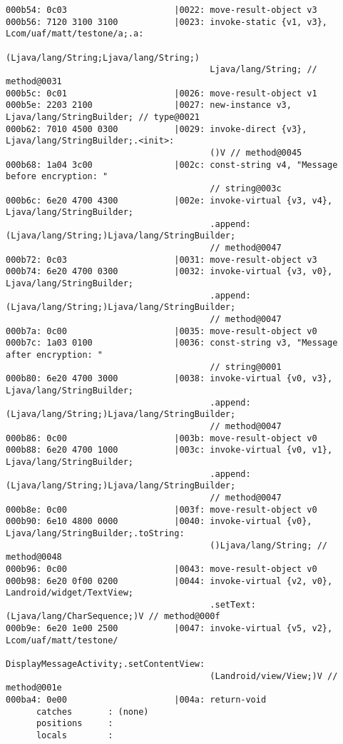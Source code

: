 \begin{lstlisting}
000b54: 0c03                     |0022: move-result-object v3
000b56: 7120 3100 3100           |0023: invoke-static {v1, v3}, Lcom/uaf/matt/testone/a;.a:
                                        (Ljava/lang/String;Ljava/lang/String;)
                                        Ljava/lang/String; // method@0031
000b5c: 0c01                     |0026: move-result-object v1
000b5e: 2203 2100                |0027: new-instance v3, Ljava/lang/StringBuilder; // type@0021
000b62: 7010 4500 0300           |0029: invoke-direct {v3}, Ljava/lang/StringBuilder;.<init>:
                                        ()V // method@0045
000b68: 1a04 3c00                |002c: const-string v4, "Message before encryption: "
                                        // string@003c
000b6c: 6e20 4700 4300           |002e: invoke-virtual {v3, v4}, Ljava/lang/StringBuilder;
                                        .append:(Ljava/lang/String;)Ljava/lang/StringBuilder;
                                        // method@0047
000b72: 0c03                     |0031: move-result-object v3
000b74: 6e20 4700 0300           |0032: invoke-virtual {v3, v0}, Ljava/lang/StringBuilder;
                                        .append:(Ljava/lang/String;)Ljava/lang/StringBuilder;
                                        // method@0047
000b7a: 0c00                     |0035: move-result-object v0
000b7c: 1a03 0100                |0036: const-string v3, "Message after encryption: "
                                        // string@0001
000b80: 6e20 4700 3000           |0038: invoke-virtual {v0, v3}, Ljava/lang/StringBuilder;
                                        .append:(Ljava/lang/String;)Ljava/lang/StringBuilder;
                                        // method@0047
000b86: 0c00                     |003b: move-result-object v0
000b88: 6e20 4700 1000           |003c: invoke-virtual {v0, v1}, Ljava/lang/StringBuilder;
                                        .append:(Ljava/lang/String;)Ljava/lang/StringBuilder;
                                        // method@0047
000b8e: 0c00                     |003f: move-result-object v0
000b90: 6e10 4800 0000           |0040: invoke-virtual {v0}, Ljava/lang/StringBuilder;.toString:
                                        ()Ljava/lang/String; // method@0048
000b96: 0c00                     |0043: move-result-object v0
000b98: 6e20 0f00 0200           |0044: invoke-virtual {v2, v0}, Landroid/widget/TextView;
                                        .setText:(Ljava/lang/CharSequence;)V // method@000f
000b9e: 6e20 1e00 2500           |0047: invoke-virtual {v5, v2}, Lcom/uaf/matt/testone/
                                        DisplayMessageActivity;.setContentView:
                                        (Landroid/view/View;)V // method@001e
000ba4: 0e00                     |004a: return-void
      catches       : (none)
      positions     :
      locals        :


\end{lstlisting}
